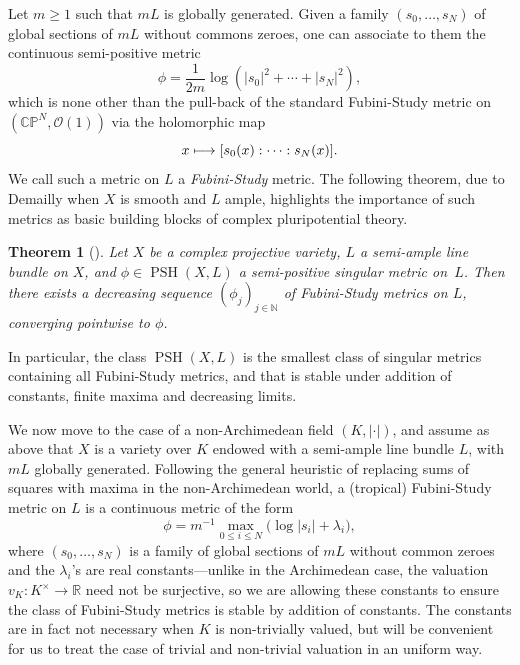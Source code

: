 \documentclass[JEP,XML,SOM,Unicode,published]{cedram}
\newcommand\mto{\mathchoice{\longmapsto}{\mapsto}{\mapsto}{\mapsto}}
\newtheorem{theo}[equation]{Theorem}
\theoremstyle{definition}
\newcommand \C{\mathbb C}
\newcommand \N{\mathbb N}
\newcommand \CP {\mathbb P}
\newcommand \R{\mathbb R}
\newcommand \gO {\mathcal O}
\DeclareMathOperator{\PSH}{PSH}
\begin{document}
Let $m \ge 1$ such that $mL$ is globally generated. Given a family $(s_0,\dots,s_N)$ of global sections of $mL$ without commons zeroes, one can associate to them the continuous semi-positive metric
\[
\phi = \frac{1}{2m} \log(\lvert s_0 \rvert^2+\cdots+\lvert s_N \rvert^2),
\]
which is none other than the pull-back of the standard Fubini-Study metric on $(\C \CP^{N}, \gO(1))$ via the holomorphic map
\[
x \mto [s_0(x):\dots:s_N(x)].
\]
We call such a metric on $L$ a \emph{Fubini-Study} metric.
The following theorem, due to Demailly \cite{Dem} when $X$ is smooth and $L$ ample, highlights the importance of such metrics as basic building blocks of complex pluripotential theory.
\begin{theo}[{\cite[Th.\,7.1]{BE}}] \label{theo berg exp}
Let $X$ be a complex projective variety, $L$ a semi-ample line bundle on $X$, and $\phi \in \PSH(X, L)$ a semi-positive singular metric on~$L$.
Then there exists a decreasing sequence $(\phi_j)_{j \in \N}$ of Fubini-Study metrics on $L$, converging pointwise to $\phi$.
\end{theo}
In particular, the class $\PSH(X, L)$ is the smallest class of singular metrics containing all Fubini-Study metrics, and that is stable under addition of constants, finite maxima and decreasing limits.

We now move to the case of a non-Archimedean field $(K, \lvert \cdot \rvert)$, and assume as above that $X$ is a variety over $K$ endowed with a semi-ample line bundle $L$, with $mL$ globally generated. Following the general heuristic of replacing sums of squares with maxima in the non-Archimedean world, a (tropical) Fubini-Study metric on $L$ is a continuous metric of the form
\[
\phi =m^{-1} \max_{0 \le i \le N} \bigl(\log \lvert s_i \rvert + \lambda_i \bigr),
\]
where $(s_0,\dots,s_N)$ is a family of global sections of $mL$ without common zeroes and the $\lambda_i$'s are real constants---unlike in the Archimedean case, the valuation $v_K: K^{\times} \to \R$ need not be surjective, so we are allowing these constants to ensure the class of Fubini-Study metrics is stable by addition of constants. The constants are in fact not necessary when $K$ is non-trivially valued, but will be convenient for us to treat the case of trivial and non-trivial valuation in an uniform way.
\end{document}
